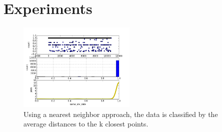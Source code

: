 \section{Experiments}

\begin{figure}
\centering
\includegraphics[width=0.5\textwidth,natwidth=300,natheight=300]{./same_srv_rate_prtcl_2_normal_training20.png}
\caption[Nearest neighbor example]{Using a nearest neighbor approach, the data is classified by the average distances to the k closest points.}
\end{figure}

